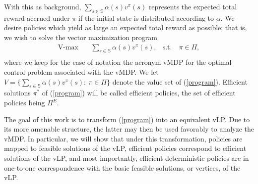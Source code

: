 \documentclass{article}
\theoremstyle{definition}
\newcounter{step}[algorithm]
\numberwithin{equation}{section}
\begin{document}
{%

With this as background, $\sum_{s \in \mathbb{S}}\alpha(s)v^{\pi}(s)$ represents the expected total reward accrued under $\pi$ if the initial state is distributed according to $\alpha$. We desire policies which yield as large an expected total reward as possible; that is, we wish to solve the vector maximization program 
\begin{equation}
\tag{vMDP}
\begin{aligned}
\label{program}
\operatorname{V-max} \quad & \sum_{s \in \mathbb{S}}\alpha(s)v^{\pi}(s), & \textrm{s.t.} \quad \pi \in \Pi,\\
\end{aligned}
\end{equation}
where we keep for the ease of notation the acronym vMDP for the optimal control problem associated with the vMDP.
We let $V = \bigl\{\sum_{s \in \mathbb{S}}\alpha(s)v^{\pi}(s):\ \pi \in \Pi\bigr\}$ denote the value set of (\ref{program}). 
Efficient solutions $\pi^*$ of (\ref{program}) will be called efficient policies, the set of efficient policies being $\Pi^E$.




The goal of this work is to transform (\ref{program}) 
into an equivalent vLP. %
Due to its more amenable structure, 
the latter may then be used favorably to analyze the vMDP. In particular, 
we will show that under this transformation, policies
are mapped to feasible solutions of the vLP, efficient policies correspond to efficient solutions of the vLP, and most importantly, efficient deterministic policies are in one-to-one correspondence with the basic feasible solutions, or vertices,  of the vLP.




}
\end{document}
